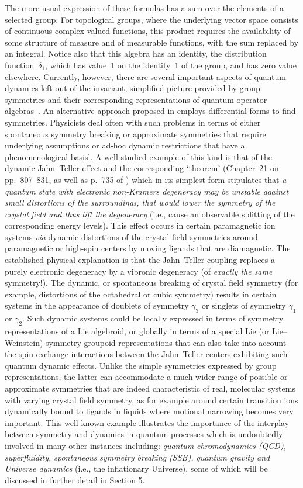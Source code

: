 \documentclass[12pt]{article}
\theoremstyle{plain}
\theoremstyle{definition}
\numberwithin{equation}{section}
\begin{document}
The more usual expression of these formulas has a sum over the elements of a selected group. For topological groups, where the underlying vector space consists of continuous complex valued functions, this product requires the availability of some structure of measure and of measurable functions, with the sum replaced by an integral. Notice also that this algebra has an identity, the distribution function~$\delta_1$, which has value~1 on the identity~1 of the group, and has zero value elsewhere.
Currently, however, there are several important aspects of quantum dynamics left out of the invariant, simplified picture provided by group symmetries and their corresponding representations of quantum operator algebras~\cite{Gilmore2k5}. An alternative approach proposed in \cite{Harrison2k5} employs differential forms to find symmetries.
Physicists deal often with such problems in terms of either spontaneous symmetry breaking or approximate symmetries that require underlying assumptions or ad-hoc dynamic restrictions that have a phenomenological basisl. A well-studied example of this kind is that of the dynamic Jahn--Teller effect and the corresponding `theorem' (Chapter~21 on pp.~807--831, as well as p.~735 of \cite{Abragam-Bleaney70}) which in its simplest form stipulates that {\em a quantum state with electronic non-Kramers degeneracy may be unstable against small distortions of the surroundings, that would lower the symmetry of the crystal field and thus lift the degeneracy} (i.e., cause an observable splitting of the corresponding energy levels). This effect occurs in certain paramagnetic ion systems {\em via} dynamic distortions of the crystal field symmetries around paramagnetic or high-spin centers by moving ligands that are diamagnetic. The established physical explanation is that the Jahn--Teller coupling replaces a purely electronic degeneracy by a vibronic degeneracy (of {\em exactly the same} symmetry!).  The dynamic, or spontaneous breaking of crystal field symmetry (for example, distortions of the octahedral or cubic symmetry) results in certain systems in the appearance of doublets of symmetry $\gamma_3$ or singlets of symmetry $\gamma_1$ or $\gamma_2$. Such dynamic systems could be locally expressed in terms of symmetry representations of a Lie algebroid, or globally in terms of a special Lie (or Lie--Weinstein) symmetry groupoid representations that can also take into account the spin exchange interactions between the Jahn--Teller centers exhibiting such quantum dynamic effects. Unlike the simple symmetries expressed by group representations, the latter can accommodate a much wider range of possible or approximate symmetries that are indeed characteristic of real, molecular systems with varying crystal field symmetry, as for example around certain transition ions dynamically bound to ligands in liquids where motional narrowing becomes very important.  This well known example illustrates the importance of the interplay between symmetry and dynamics in quantum processes which is undoubtedly involved in many other instances including: \emph{quantum chromodynamics (QCD), superfluidity, spontaneous symmetry breaking (SSB), quantum gravity and Universe dynamics} (i.e., the inflationary Universe), some of which will be discussed in further detail in Section 5.
\end{document}
